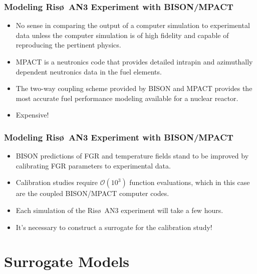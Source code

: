 \documentclass{beamer}
\begin{document}
\begin{frame}
\frametitle{Modeling Ris\o~AN3 Experiment with BISON/MPACT}

\begin{itemize}
  \item No sense in comparing the output of a computer simulation to
experimental data unless the computer simulation is of high fidelity and capable
of reproducing the pertinent physics.
  \item MPACT is a neutronics code that provides detailed intrapin and azimuthally dependent
neutronics data in the fuel elements. 
  \item The two-way coupling scheme provided by BISON and MPACT provides the most accurate fuel performance modeling available for a nuclear reactor.
  \item Expensive! 
\end{itemize}

\end{frame}
\begin{frame}
\frametitle{Modeling Ris\o~AN3 Experiment with BISON/MPACT}

\begin{itemize}
  \item BISON predictions of FGR and temperature fields stand to be improved by calibrating FGR parameters to experimental data.
  \item Calibration studies require $\mathcal{O}(10^3)$ function evaluations, which in this case are the coupled BISON/MPACT computer codes.
  \item Each simulation of the Ris\o~AN3 experiment will take a few hours.
  \item It's necessary to construct a surrogate for the calibration study!   
\end{itemize}

\end{frame}

\section{Surrogate Models}

\end{document}
